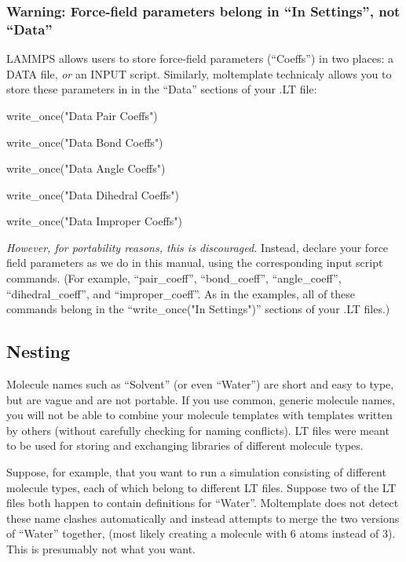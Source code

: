 \documentclass[11pt]{article}
\begin{document}
\subsubsection*{Warning: Force-field parameters belong in ``In Settings'', not ``Data''}

LAMMPS allows users to store force-field parameters (``Coeffs'') in two places:
a DATA file, \textit{or} an INPUT script. 
Similarly, moltemplate technicaly allows you to store these parameters in 
in the ``Data'' sections of your .LT file:
\begin{list}{}
\item write\_once("Data Pair Coeffs")
\item write\_once("Data Bond Coeffs")
\item write\_once("Data Angle Coeffs")
\item write\_once("Data Dihedral Coeffs")
\item write\_once("Data Improper Coeffs")
\item
\end{list}

\textit{However, for portability reasons, this is discouraged.} 
Instead, declare your force field parameters 
as we do in this manual, 
using the corresponding input script commands.
(For example, ``pair\_coeff'', ``bond\_coeff'', ``angle\_coeff'',
 ``dihedral\_coeff'', and ``improper\_coeff''.
As in the examples, all of these commands belong in the 
``write\_once("In Settings")'' sections of your .LT files.)


\subsection{Nesting}
\label{sec:nesting}
Molecule names such as ``Solvent'' (or even ``Water'')
are short and easy to type, but are vague and are not portable.
If you use common, generic molecule names, you will not be able
to combine your molecule templates with templates written 
by others (without carefully checking for naming conflicts).
LT files were meant to be used for storing 
and exchanging libraries of different molecule types.

Suppose, for example, that you want to run a simulation consisting of
different molecule types, each of which belong to different LT files.
Suppose two of the LT files both happen to contain definitions for
``Water''.
Moltemplate does not detect these name clashes automatically 
and instead attempts to merge the two versions of ``Water'' together,
(most likely creating a molecule with 6 atoms instead of 3).
This is presumably not what you want.
\end{document}
